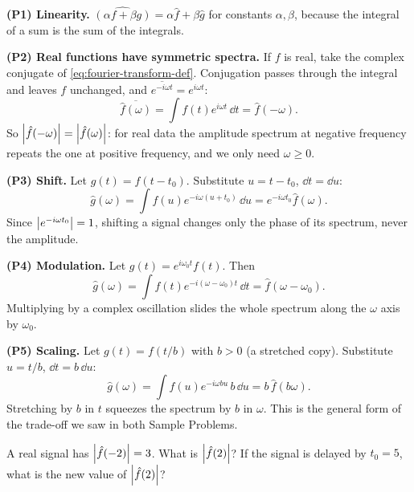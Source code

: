 \textbf{(P1) Linearity.} $\widehat{(\alpha f+\beta g)}=\alpha\hat f+\beta\hat g$ for constants $\alpha,\beta$, because the integral of a sum is the sum of the integrals.

\textbf{(P2) Real functions have symmetric spectra.} If $f$ is real, take the complex conjugate of \eqref{eq:fourier-transform-def}. Conjugation passes through the integral and leaves $f$ unchanged, and $\overline{e^{-i\omega t}}=e^{i\omega t}$:
\begin{equation}
\overline{\hat f(\omega)}=\int f(t)e^{i\omega t}\,\dd t=\hat f(-\omega).
\label{eq:fourier-transform-hermitian}
\end{equation}
So $\left\lvert \hat f(-\omega)\right\rvert=\left\lvert \hat f(\omega)\right\rvert$: for real data the amplitude spectrum at negative frequency repeats the one at positive frequency, and we only need $\omega\ge0$.

\textbf{(P3) Shift.} Let $g(t)=f(t-t_0)$. Substitute $u=t-t_0$, $\dd t=\dd u$:
\begin{equation}
\hat g(\omega)=\int f(u)e^{-i\omega(u+t_0)}\,\dd u=e^{-i\omega t_0}\hat f(\omega).
\label{eq:fourier-transform-shift}
\end{equation}
Since $\left\lvert e^{-i\omega t_0}\right\rvert=1$, shifting a signal changes only the phase of its spectrum, never the amplitude.

\textbf{(P4) Modulation.} Let $g(t)=e^{i\omega_0t}f(t)$. Then
\begin{equation}
\hat g(\omega)=\int f(t)e^{-i(\omega-\omega_0)t}\,\dd t=\hat f(\omega-\omega_0).
\label{eq:fourier-transform-modulation}
\end{equation}
Multiplying by a complex oscillation slides the whole spectrum along the $\omega$ axis by $\omega_0$.

\textbf{(P5) Scaling.} Let $g(t)=f(t/b)$ with $b>0$ (a stretched copy). Substitute $u=t/b$, $\dd t=b\,\dd u$:
\begin{equation}
\hat g(\omega)=\int f(u)e^{-i\omega bu}\,b\,\dd u=b\,\hat f(b\omega).
\end{equation}
Stretching by $b$ in $t$ squeezes the spectrum by $b$ in $\omega$. This is the general form of the trade-off we saw in both Sample Problems.

\begin{checkpoint}
A real signal has $\left\lvert \hat f(-2)\right\rvert=3$. What is $\left\lvert \hat f(2)\right\rvert$? If the signal is delayed by $t_0=5$, what is the new value of $\left\lvert \hat f(2)\right\rvert$?
\end{checkpoint}

